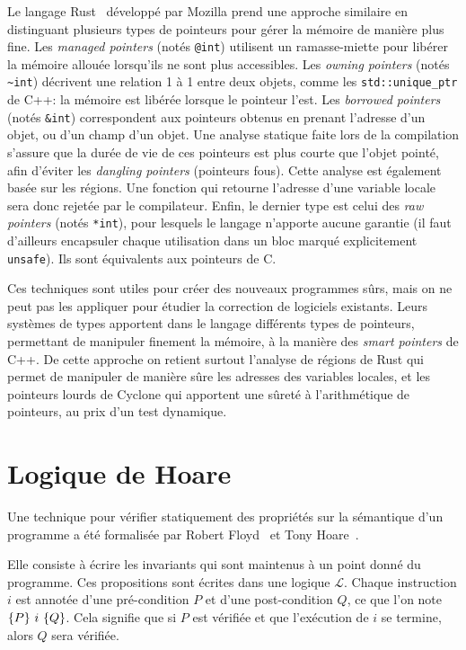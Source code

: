 Le langage Rust~ développé par Mozilla prend une approche similaire
en distinguant plusieurs types de pointeurs pour gérer la mémoire de manière
plus fine. Les \emph{managed pointers} (notés \texttt{@int}) utilisent un
ramasse-miette pour libérer la mémoire allouée lorsqu'ils ne sont plus
accessibles. Les \emph{owning pointers} (notés \texttt{\textasciitilde{}int})
décrivent une relation 1 à 1 entre deux objets, comme les
\texttt{std::unique\_ptr} de C++: la mémoire est libérée lorsque le pointeur
l'est. Les \emph{borrowed pointers} (notés \texttt{\&int}) correspondent aux
pointeurs obtenus en prenant l'adresse d'un objet, ou d'un champ d'un objet. Une
analyse statique faite lors de la compilation s'assure que la durée de vie de
ces pointeurs est plus courte que l'objet pointé, afin d'éviter les
\emph{dangling pointers} (pointeurs fous). Cette analyse est également basée sur
les régions. Une fonction qui retourne l'adresse d'une variable locale sera donc
rejetée par le compilateur. Enfin, le dernier type est celui des \emph{raw
pointers} (notés \texttt{*int}), pour lesquels le langage n'apporte aucune
garantie (il faut d'ailleurs encapsuler chaque utilisation dans un bloc marqué
explicitement \texttt{unsafe}). Ils sont équivalents aux pointeurs de C.


Ces techniques sont utiles pour créer des nouveaux programmes sûrs, mais on ne
peut pas les appliquer pour étudier la correction de logiciels existants. Leurs
systèmes de types apportent dans le langage différents types de pointeurs,
permettant de manipuler finement la mémoire, à la manière des \emph{smart
pointers} de C++. De cette approche on retient surtout l'analyse de régions de
Rust qui permet de manipuler de manière sûre les adresses des variables locales,
et les pointeurs lourds de Cyclone qui apportent une sûreté à l'arithmétique de
pointeurs, au prix d'un test dynamique.


\section{Logique de Hoare}

Une technique pour vérifier statiquement des propriétés sur la sémantique d'un
programme a été formalisée par Robert Floyd~\cite{FloydMeaning} et Tony
Hoare~\cite{hoare}.

Elle consiste à écrire les invariants qui sont maintenus à un point donné du
programme. Ces propositions sont écrites dans une logique $\mathcal{L}$. Chaque
instruction $i$ est annotée d'une pré-condition $P$ et d'une post-condition $Q$,
ce que l'on note $\{P\}~i~\{Q\}$. Cela signifie que si $P$ est vérifiée et que
l'exécution de $i$ se termine, alors $Q$ sera vérifiée.

